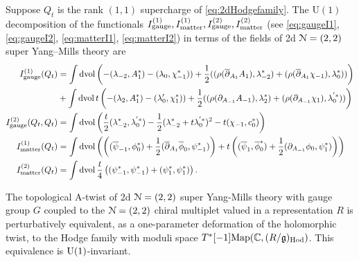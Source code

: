 \documentclass[10pt, oneside]{article}
\renewcommand{\U}{\mathrm{U}}
\begin{document}
\begin{prop}
Suppose $Q_t$ is the rank $(1,1)$ supercharge of \ref{eq:2dHodgefamily}.
The $\U(1)$ decomposition of the functionals $I_{\rm gauge}^{(1)}, I^{(1)}_{\rm matter}, I^{(2)}_{\rm gauge}, I^{(2)}_{\rm matter}$ (see \eqref{eq:gaugeI1},  \eqref{eq:gaugeI2}, \eqref{eq:matterI1}, \eqref{eq:matterI2}) in terms of the fields of 2d $\mathcal N=(2,2)$ super Yang--Mills theory are
\begin{align*}
I_{\rm gauge}^{(1)}(Q_t) &= \int \operatorname{dvol} \left(-(\lambda_{-2}, A^*_1) - (\lambda_0, \chi^*_{-1})) + \frac 12((\rho(\overline{\partial}_{A_1}A_1), \lambda_{-2}^*) + (\rho(\overline{\partial}_{A_1}\chi_{-1}), \lambda_0^*)) \right)  \\
&+  \int \operatorname{dvol} t \left( -(\lambda_{2}, A^*_1) - (\lambda'_0, \chi^*_{1})) + \frac 12((\rho(\partial_{A_{-1}}A_{-1}), \lambda_{2}^*) + (\rho(\partial_{A_{-1}}\chi_{1}), \lambda_0^{'*}))   \right)  \\
I^{(2)}_{\rm gauge} (Q_t, Q_t) &= \int \operatorname{dvol} \left(\frac t2 (\lambda_{-2}^*, \lambda_0^{'*}) - \frac 12(\lambda_{-2}^* + t\lambda_0^{'*})^2 - t(\chi_{-1}, c_0^*)\right)  \\
I_{\rm matter}^{(1)}(Q_t) &= \int \operatorname{dvol} \left(\left( (\overline{\psi}_{-1},\phi_0^*) + \frac 12 (\overline{\partial}_{A_1} \overline{\phi}_0, \psi_{-1}^*) \right) +t\left( (\overline{\psi}_{1},\overline{\phi}_0^*) + \frac 12 (\partial_{A_{-1}}  \phi_0, \psi_{1}^*)  \right)\right)  \\
I_{\rm matter}^{(2)}(Q_t) &= \int \operatorname{dvol} \frac t4 \left( (\psi^*_{-1} ,\psi^*_{-1}) +  (\psi^*_{1}, \psi^*_{1}) \right).
\end{align*}
\end{prop}

\begin{theorem} \label{2d_2_A_twist_thm}
The topological A-twist of 2d $\mathcal{N}=(2,2)$ super Yang-Mills theory with gauge group $G$ coupled to the $\mathcal{N}=(2,2)$ chiral multiplet valued in a representation $R$ is perturbatively equivalent, as a one-parameter deformation of the holomorphic twist, to the Hodge family with moduli space $T^*[-1]\mathrm{Map}(\mathbb C, (R/\mathfrak{g})_{\mathrm{Hod}})$.  This equivalence is $\mathrm{U}(1)$-invariant.
\end{theorem}
\end{document}
